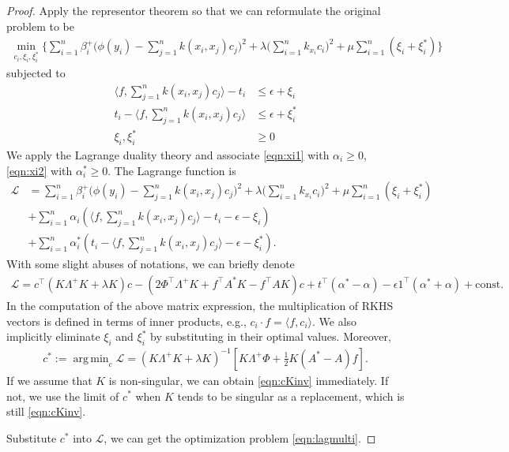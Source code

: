 \documentclass[a4paper]{article}
\renewcommand{\cal}{\mathcal}
\newcommand{\T}{\intercal}
\DeclareMathOperator*{\argmin}{arg\,min}
\begin{document}
\begin{proof}
Apply the representor theorem so that we can reformulate the original problem to be
\begin{align}
\min_{c_i,\xi_i,\xi_i^*}\bigg\{ \sum_{i=1}^n \beta_i^+ \bigg(\phi(y_i) - \sum_{j=1}^n k(x_i,x_j)c_j\bigg)^2 + \lambda\bigg(\sum_{i=1}^n k_{x_i}c_i\bigg)^2 + \mu \sum_{i=1}^n (\xi_i + \xi^*_i) \bigg\}
\end{align}
subjected to
\begin{align}
\langle f, \sum_{j=1}^n k(x_i,x_j)c_j \rangle - t_i &\leq \epsilon + \xi_i \label{eqn:xi1}\\
t_i - \langle f,\sum_{j=1}^n k(x_i,x_j)c_j \rangle &\leq \epsilon + \xi_i^*\label{eqn:xi2}\\
\xi_i, \xi_i^* &\geq 0
\end{align}
We apply the Lagrange duality theory \cite{boyd2004convex} and associate \eqref{eqn:xi1} with $\alpha_i \geq 0$, \eqref{eqn:xi2} with $\alpha_i^* \geq 0$. The Lagrange function is
\begin{align*}
 \cal{L} &= \sum_{i=1}^n \beta_i^+ \bigg(\phi(y_i) - \sum_{j=1}^n k(x_i,x_j)c_j\bigg)^2 + \lambda\bigg(\sum_{i=1}^n k_{x_i}c_i\bigg)^2 + \mu \sum_{i=1}^n (\xi_i + \xi^*_i)\\
 &+ \sum_{i=1}^n \alpha_i (\langle f,\sum_{j=1}^n k(x_i,x_j)c_j \rangle - t_i - \epsilon -\xi_i)\\
 &+ \sum_{i=1}^n \alpha_i^* (t_i - \langle f,\sum_{j=1}^n k(x_i,x_j)c_j \rangle - \epsilon - \xi_i^*).
\end{align*}
With some slight abuses of notations, we can briefly denote
\begin{align}
\cal{L} = c^\T (K\Lambda^+ K + \lambda K)c - (2\Phi^\T \Lambda^+ K + f^\T A^* K - f^\T A K)c + t^\T (\alpha^* - \alpha) - \epsilon 1^\T (\alpha^* + \alpha) + \text{const}.
\end{align}
In the computation of the above matrix expression, the multiplication of RKHS vectors is defined in terms of inner products, e.g., $c_i \cdot f = \langle f, c_i \rangle$. We also implicitly eliminate $\xi_i$ and $\xi_i^*$ by substituting in their optimal values. Moreover,
\begin{align}
c^* := \argmin_c \cal{L} = (K\Lambda^+ K + \lambda K)^{-1} \left[ K\Lambda^+ \Phi + \frac{1}{2}K(A^* - A)f \right].
\end{align}
If we assume that $K$ is non-singular, we can obtain \eqref{eqn:cKinv} immediately. If not, we use the limit of $c^*$ when $K$ tends to be singular as a replacement, which is still \eqref{eqn:cKinv}.

Substitute $c^*$ into $\cal{L}$, we can get the optimization problem \eqref{eqn:lagmulti}. 
\end{proof}
\end{document}
